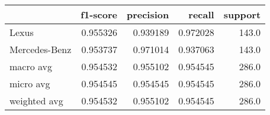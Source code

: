 \begin{tabular}{lrrrr}
\toprule
{} &  f1-score &  precision &    recall &  support \\
\midrule
Lexus         &  0.955326 &   0.939189 &  0.972028 &    143.0 \\
Mercedes-Benz &  0.953737 &   0.971014 &  0.937063 &    143.0 \\
macro avg     &  0.954532 &   0.955102 &  0.954545 &    286.0 \\
micro avg     &  0.954545 &   0.954545 &  0.954545 &    286.0 \\
weighted avg  &  0.954532 &   0.955102 &  0.954545 &    286.0 \\
\bottomrule
\end{tabular}
